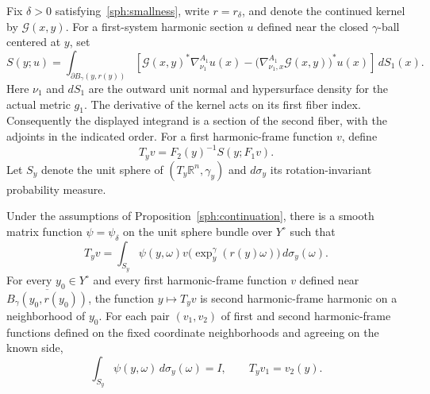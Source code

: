 Fix $\delta>0$ satisfying~\eqref{sph:smallness}, write $r=r_\delta$,
and denote the continued kernel by $\mathcal G(x,y)$.
For a first-system harmonic section $u$ defined near the closed
$\gamma$-ball centered at $y$, set
\begin{equation}\label{sph:flux}
 S(y;u)=\int_{\partial B_\gamma(y,r(y))}
 \left[\mathcal G(x,y)^*\nabla^{A_1}_{\nu_1}u(x)
       -\bigl(\nabla^{A_1}_{\nu_1,x}\mathcal G(x,y)\bigr)^*u(x)\right]
 \,dS_1(x).
\end{equation}
Here $\nu_1$ and $dS_1$ are the outward unit normal and hypersurface
density for the actual metric $g_1$.  The derivative of the kernel
acts on its first fiber index.  Consequently the displayed integrand
is a section of the second fiber, with the adjoints in the indicated
order.  For a first harmonic-frame function $v$, define
\begin{equation}\label{sph:transfer-definition}
 T_yv=F_2(y)^{-1}S(y;F_1v).
\end{equation}
Let $S_y$ denote the unit sphere of $(T_y\mathbb R^n,\gamma_y)$ and
$d\sigma_y$ its rotation-invariant probability measure.

\begin{proposition}\label{sph:transfer}
Under the assumptions of Proposition~\ref{sph:continuation}, there
is a smooth matrix function $\psi=\psi_\delta$ on the unit sphere
bundle over $Y^\circ$ such that
\begin{equation}\label{sph:density-representation}
 T_yv=\int_{S_y}\psi(y,\omega)
       v\bigl(\exp_y^\gamma(r(y)\omega)\bigr)\,d\sigma_y(\omega).
\end{equation}
For every $y_0\in Y^\circ$ and every first harmonic-frame function
$v$ defined near $\overline{B_\gamma(y_0,r(y_0))}$, the function
$y\mapsto T_yv$ is second harmonic-frame harmonic on a neighborhood
of $y_0$.  For each pair $(v_1,v_2)$ of first and second harmonic-frame
functions defined on the fixed coordinate neighborhoods and agreeing
on the known side,
\begin{equation}\label{sph:reproduction}
 \int_{S_y}\psi(y,\omega)\,d\sigma_y(\omega)=I,
 \qquad T_yv_1=v_2(y).
\end{equation}
\end{proposition}

